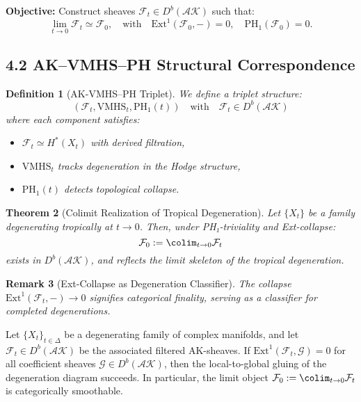 \documentclass[11pt]{article}
\newtheorem{theorem}{Theorem}[section]
\newtheorem{definition}[theorem]{Definition}
\newtheorem{remark}[theorem]{Remark}
\begin{document}
\textbf{Objective:} Construct sheaves \( \mathcal{F}_t \in D^b(\mathcal{AK}) \) such that:
\[
\lim_{t \to 0} \mathcal{F}_t \simeq \mathcal{F}_0, \quad \text{with} \quad \mathrm{Ext}^1(\mathcal{F}_0, -) = 0, \quad \mathrm{PH}_1(\mathcal{F}_0) = 0.
\]

\subsection{4.2 AK--VMHS--PH Structural Correspondence}

\begin{definition}[AK-VMHS--PH Triplet]
We define a triplet structure:
\[
(\mathcal{F}_t, \mathrm{VMHS}_t, \mathrm{PH}_1(t)) \quad \text{with} \quad \mathcal{F}_t \in D^b(\mathcal{AK})
\]
where each component satisfies:
\begin{itemize}
    \item \( \mathcal{F}_t \simeq H^*(X_t) \) with derived filtration,
    \item \( \mathrm{VMHS}_t \) tracks degeneration in the Hodge structure,
    \item \( \mathrm{PH}_1(t) \) detects topological collapse.
\end{itemize}
\end{definition}

\begin{theorem}[Colimit Realization of Tropical Degeneration]
Let \( \{X_t\} \) be a family degenerating tropically at \( t \to 0 \). Then, under PH₁-triviality and Ext-collapse:
\[
\mathcal{F}_0 := \colim_{t \to 0} \mathcal{F}_t
\]
exists in \( D^b(\mathcal{AK}) \), and reflects the limit skeleton of the tropical degeneration.
\end{theorem}

\begin{remark}[Ext-Collapse as Degeneration Classifier]
The collapse \( \mathrm{Ext}^1(\mathcal{F}_t, -) \to 0 \) signifies categorical finality, serving as a classifier for completed degenerations.
\end{remark}

\begin{lemma}
Let \( \{X_t\}_{t \in \Delta} \) be a degenerating family of complex manifolds,  
and let \( \mathcal{F}_t \in D^b(\mathcal{AK}) \) be the associated filtered AK-sheaves.  
If \( \mathrm{Ext}^1(\mathcal{F}_t, \mathcal{G}) = 0 \) for all coefficient sheaves \( \mathcal{G} \in D^b(\mathcal{AK}) \), then the local-to-global gluing of the degeneration diagram succeeds.  
In particular, the limit object \( \mathcal{F}_0 := \colim_{t \to 0} \mathcal{F}_t \) is categorically smoothable.
\end{lemma}
\end{document}
